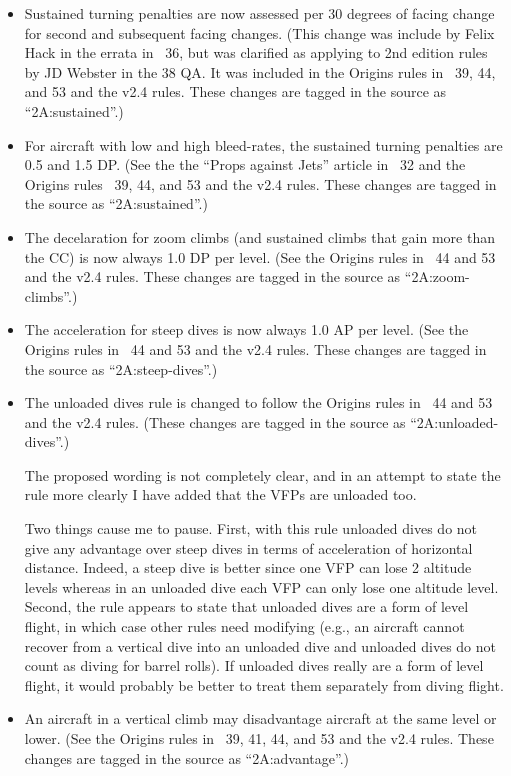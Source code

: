 \documentclass[10pt]{article}
\begin{document}
\begin{itemize}
    \item Sustained turning penalties are now assessed per 30 degrees of facing change for second and subsequent facing changes. (This change was include by Felix Hack in the errata in {\APJ}~36, but was clarified as applying to 2nd edition rules by JD Webster in the {\APJ} 38 QA. It was included in the Origins rules in {\APJ}~39, 44, and 53 and the v2.4 rules. These changes are tagged in the source as “2A:sustained”.)

    \item For aircraft with low and high bleed-rates, the sustained turning penalties are 0.5 and 1.5 DP. (See the the “Props against Jets” article in {\APJ}~32 and the Origins rules {\APJ}~39, 44, and 53 and the v2.4 rules. These changes are tagged in the source as “2A:sustained”.) 

    \item The decelaration for zoom climbs (and sustained climbs that gain more than the CC) is now always 1.0 DP per level. (See the Origins rules {in \APJ}~44 and 53 and the v2.4 rules. These changes are tagged in the source as “2A:zoom-climbs”.) 

    \item The acceleration for steep dives is now always 1.0 AP per level. (See the Origins rules in {\APJ}~44 and 53 and the v2.4 rules. These changes are tagged in the source as “2A:steep-dives”.)

    \item The unloaded dives rule is changed to follow the Origins rules in {\APJ}~44 and 53 and the v2.4 rules. (These changes are tagged in the source as “2A:unloaded-dives”.) 
    
    The proposed wording is not completely clear, and in an attempt to state the rule more clearly I have added that the VFPs are unloaded too. 
    
    Two things cause me to pause. First, with this rule unloaded dives do not give any advantage over steep dives in terms of acceleration of horizontal distance. Indeed, a steep dive is better since one VFP can lose 2 altitude levels whereas in an unloaded dive each VFP can only lose one altitude level. Second, the rule appears to state that unloaded dives are a form of level flight, in which case other rules need modifying (e.g., an aircraft cannot recover from a vertical dive into an unloaded dive and unloaded dives do not count as diving for barrel rolls). If unloaded dives really are a form of level flight, it would probably be better to treat them separately from diving flight.

    \item An aircraft in a vertical climb may disadvantage aircraft at the same level or lower. (See the Origins rules in {\APJ}~39, 41, 44, and 53 and the v2.4 rules. These changes are tagged in the source as “2A:advantage”.)

\end{itemize}
\end{document}
